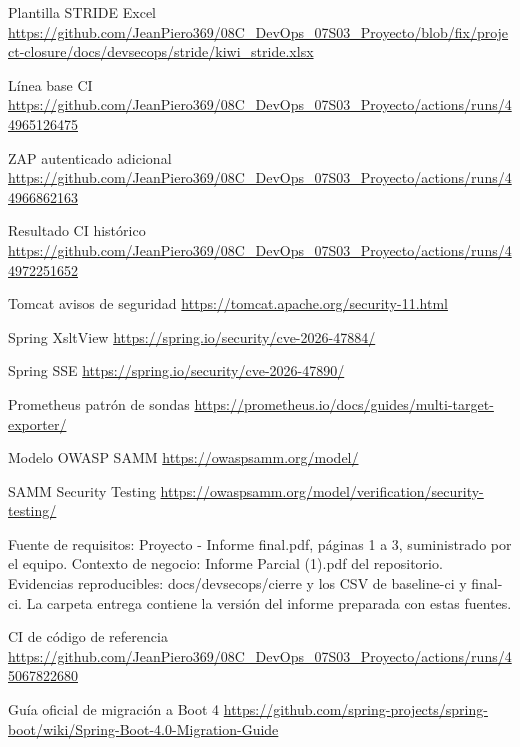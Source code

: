 \documentclass[12pt,a4paper]{article}
\begin{document}
Plantilla STRIDE Excel \url{https://github.com/JeanPiero369/08C_DevOps_07S03_Proyecto/blob/fix/project-closure/docs/devsecops/stride/kiwi_stride.xlsx}\par
Línea base CI \url{https://github.com/JeanPiero369/08C_DevOps_07S03_Proyecto/actions/runs/44965126475}\par
ZAP autenticado adicional \url{https://github.com/JeanPiero369/08C_DevOps_07S03_Proyecto/actions/runs/44966862163}\par
Resultado CI histórico \url{https://github.com/JeanPiero369/08C_DevOps_07S03_Proyecto/actions/runs/44972251652}\par
Tomcat avisos de seguridad \url{https://tomcat.apache.org/security-11.html}\par
Spring XsltView \url{https://spring.io/security/cve-2026-47884/}\par
Spring SSE \url{https://spring.io/security/cve-2026-47890/}\par
Prometheus patrón de sondas \url{https://prometheus.io/docs/guides/multi-target-exporter/}\par
Modelo OWASP SAMM \url{https://owaspsamm.org/model/}\par
SAMM Security Testing \url{https://owaspsamm.org/model/verification/security-testing/}\par
Fuente de requisitos: Proyecto - Informe final.pdf, páginas 1 a 3, suministrado por el equipo. Contexto de negocio: Informe Parcial (1).pdf del repositorio. Evidencias reproducibles: docs/devsecops/cierre y los CSV de baseline-ci y final-ci. La carpeta entrega contiene la versión del informe preparada con estas fuentes.\par
CI de código de referencia \url{https://github.com/JeanPiero369/08C_DevOps_07S03_Proyecto/actions/runs/45067822680}\par
Guía oficial de migración a Boot 4 \url{https://github.com/spring-projects/spring-boot/wiki/Spring-Boot-4.0-Migration-Guide}\par
\end{document}
